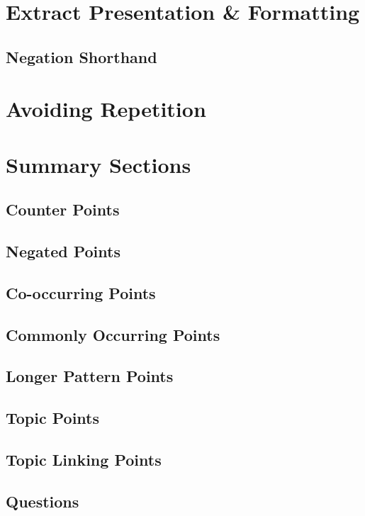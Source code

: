   \section{Extract Presentation \& Formatting}
    \subsection{Negation Shorthand}
  \section{Avoiding Repetition}
  \section{Summary Sections}
    \subsection{Counter Points}
    \subsection{Negated Points}
    \subsection{Co-occurring Points}
    \subsection{Commonly Occurring Points}
    \subsection{Longer Pattern Points}
    \subsection{Topic Points}
    \subsection{Topic Linking Points}
    \subsection{Questions}
